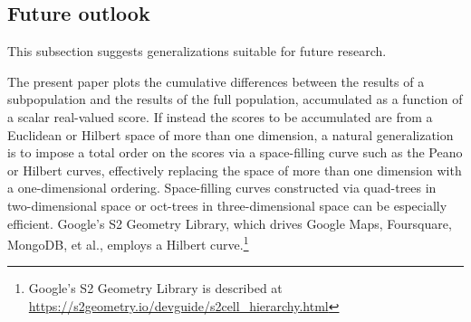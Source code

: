 \documentclass{article}
\begin{document}
\subsection{Future outlook}
\label{outlook}

This subsection suggests generalizations suitable for future research.

The present paper plots the cumulative differences
between the results of a subpopulation and the results of the full population,
accumulated as a function of a scalar real-valued score.
If instead the scores to be accumulated are from a Euclidean or Hilbert space
of more than one dimension, a natural generalization is to impose
a total order on the scores via a space-filling curve
such as the Peano or Hilbert curves, effectively replacing
the space of more than one dimension with a one-dimensional ordering.
Space-filling curves constructed via quad-trees in two-dimensional space
or oct-trees in three-dimensional space can be especially efficient.
Google's S2 Geometry Library, which drives Google Maps, Foursquare, MongoDB,
et al., employs a Hilbert curve.\footnote{Google's S2 Geometry Library
is described at \url{https://s2geometry.io/devguide/s2cell_hierarchy.html}}
\end{document}
